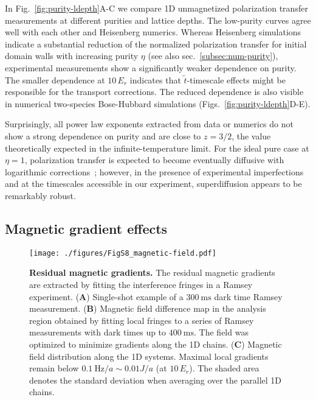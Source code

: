 \documentclass[
 reprint,
 superscriptaddress,
 amsmath,amssymb,
 aps,
 pra,
]{revtex4-2}
\begin{document}

In Fig.~\ref{fig:purity-ldepth}A-C we compare 1D unmagnetized polarization transfer measurements at different purities and lattice depths. The low-purity curves agree well with each other and Heisenberg numerics. Whereas Heisenberg simulations indicate a substantial reduction of the normalized polarization transfer for initial domain walls with increasing purity $\eta$ (see also sec.~\ref{subsec:num-purity}), experimental measurements show a significantly weaker dependence on purity.
The smaller dependence at $10\,E_r$ indicates that $\tilde{t}$-timescale effects might be responsible for the transport corrections.
The reduced dependence is also visible in numerical two-species Bose-Hubbard simulations (Figs.~\ref{fig:purity-ldepth}D-E).

Surprisingly, all power law exponents extracted from data or numerics do not show a strong dependence on purity and are close to $z = 3/2$, the value theoretically expected in the infinite-temperature limit. For the ideal pure case at $\eta=1$, polarization transfer is expected to become eventually diffusive with logarithmic corrections~\cite{Gamayun2019}; however, in the presence of experimental imperfections and at the timescales accessible in our experiment, superdiffusion appears to be remarkably robust.


\subsection{Magnetic gradient effects}

\begin{figure}
    \centering
    \texttt{[image: ./figures/FigS8\_magnetic-field.pdf]}
    \caption{\textbf{Residual magnetic gradients.}
        The residual magnetic gradients are extracted by fitting the interference fringes in a Ramsey experiment.
        (\textbf{A}) Single-shot example of a $\SI{300}{\milli\second}$ dark time Ramsey measurement.
        (\textbf{B}) Magnetic field difference map in the analysis region obtained by fitting local fringes to a series of Ramsey measurements with dark times up to $\SI{400}{\milli\second}$. The field was optimized to minimize gradients along the 1D chains.
        (\textbf{C}) Magnetic field distribution along the 1D systems. Maximal local gradients remain below $\SI{0.1}{\hertz}/a \sim 0.01 J/a$ (at $10\,E_r$). The shaded area denotes the standard deviation when averaging over the parallel 1D chains.
    }
    \label{fig:magnetic-field}
\end{figure}
\end{document}
